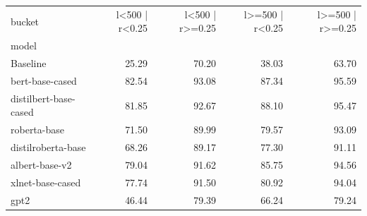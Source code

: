 \begin{tabular}{lrrrr}
\toprule
bucket & l<500 | r<0.25 & l<500 | r>=0.25 & l>=500 | r<0.25 & l>=500 | r>=0.25 \\
model &  &  &  &  \\
\midrule
Baseline & 25.29 & 70.20 & 38.03 & 63.70 \\
bert-base-cased & 82.54 & 93.08 & 87.34 & 95.59 \\
distilbert-base-cased & 81.85 & 92.67 & 88.10 & 95.47 \\
roberta-base & 71.50 & 89.99 & 79.57 & 93.09 \\
distilroberta-base & 68.26 & 89.17 & 77.30 & 91.11 \\
albert-base-v2 & 79.04 & 91.62 & 85.75 & 94.56 \\
xlnet-base-cased & 77.74 & 91.50 & 80.92 & 94.04 \\
gpt2 & 46.44 & 79.39 & 66.24 & 79.24 \\
\bottomrule
\end{tabular}
